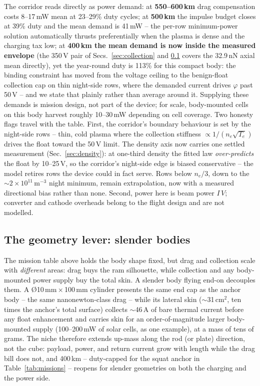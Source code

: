 \documentclass[11pt]{article}
\begin{document}
The corridor reads directly as power demand: at \textbf{550--600\,km} drag
compensation costs 8--17\,mW mean at 23--29\% duty cycles; at
\textbf{500\,km} the impulse budget closes at 39\% duty and the mean demand
is 41\,mW -- the per-row minimum-power solution automatically thrusts
preferentially when the plasma is dense and the charging tax low; at
\textbf{400\,km the mean demand is now inside the measured envelope}
(the 350\,V pair of Secs.~\ref{sec:collection} and \ref{sec:slender}
covers the 32.9\,nN axial mean directly), yet the year-round duty is
113\% for this compact body: the binding constraint has moved from the
voltage ceiling to the benign-float collection cap on thin night-side
rows, where the demanded current drives $\varphi$ past 50\,V -- and we
state that plainly rather than average around it. Supplying these demands is mission design,
not part of the device; for scale, body-mounted cells on this body harvest
roughly 10--30\,mW depending on cell coverage. Two
honesty flags travel with the table. First, the corridor's boundary
behaviour is set by the night-side rows -- thin, cold plasma where the
collection stiffness $\propto 1/(n_e\sqrt{T_e})$ drives the float toward
the 50\,V limit. The density axis now carries one settled measurement
(Sec.~\ref{sec:density}): at one-third density the fitted law
\emph{over-predicts} the float by 10--25\,V, so the corridor's
night-side edge is biased conservative -- the model retires rows the
device could in fact serve. Rows below $n_e/3$, down to the
$\sim$$2\times10^{11}$\,m$^{-3}$ night minimum, remain extrapolation,
now with a measured directional bias rather than none. Second, power
here is beam power $I\,V$; converter and cathode overheads belong to the
flight design and are not modelled.

\subsection{The geometry lever: slender bodies}
\label{sec:slender}
The mission table above holds the body shape fixed, but drag and collection
scale with \emph{different} areas: drag buys the ram silhouette, while
collection and any body-mounted power supply buy the total skin. A slender body flying
end-on decouples them. A \O10\,mm\,$\times$\,100\,mm cylinder presents the
same end cap as the anchor body -- the same nanonewton-class drag -- while its
lateral skin ($\sim$31\,cm$^2$, ten times the anchor's total surface)
collects $\sim$46\,\textmu A of bare thermal current before any float
enhancement and carries skin for an order-of-magnitude larger body-mounted
supply (100--200\,mW of solar cells, as one example), at a mass of tens of
grams. The niche
therefore extends up-mass along the rod (or plate) direction, not the cube:
payload, power, and return current grow with length while the drag bill
does not, and 400\,km -- duty-capped for the squat anchor in
Table~\ref{tab:missions} -- reopens for slender geometries on both the
charging and the power side.
\end{document}
